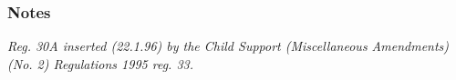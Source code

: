 \documentclass[a4paper]{article}
\newcommand\amendment[1]{\subsubsection*{Notes}{\itshape\frenchspacing\footnotesize #1 \par}}
\begin{document}
\amendment{
Reg. 30A inserted (22.1.96) by the Child Support (Miscellaneous Amendments) (No. 2) Regulations 1995 reg. 33.
}

%
%
%
%
%
%
\end{document}
